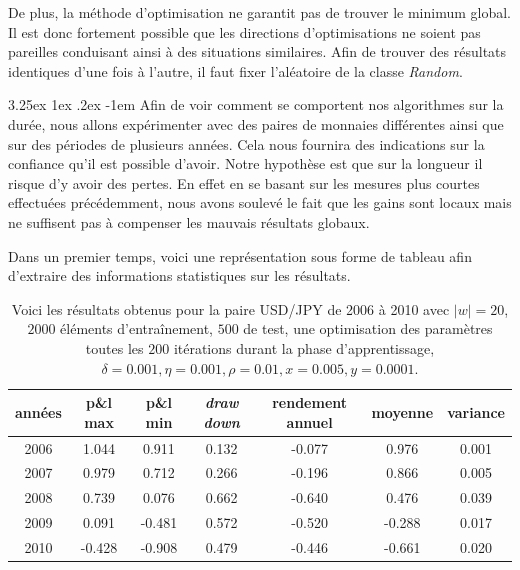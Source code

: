 \documentclass[a4paper, 11pt]{article}
\makeatletter
\renewcommand\paragraph{\@startsection{paragraph}{5}{\z@}%
  {3.25ex \@plus1ex \@minus.2ex}%
  {-1em}%
  {\normalfont\normalsize\bfseries}}
\makeatother
\begin{document}
De plus, la méthode d'optimisation ne garantit pas de trouver le minimum global. Il est donc fortement possible que les directions d'optimisations ne soient pas pareilles conduisant ainsi à des situations similaires. Afin de trouver des résultats identiques d'une fois à l'autre, il faut fixer l'aléatoire de la classe \textit{Random}.
 

\paragraph{}
Afin de voir comment se comportent nos algorithmes sur la durée, nous allons expérimenter avec des paires de monnaies différentes ainsi que sur des périodes de plusieurs années. Cela nous fournira des indications sur la confiance qu'il est possible d'avoir. Notre hypothèse est que sur la longueur il risque d'y avoir des pertes. En effet en se basant sur les mesures plus courtes effectuées précédemment, nous avons soulevé le fait que les gains sont locaux mais ne suffisent pas à compenser les mauvais résultats globaux.

Dans un premier temps, voici une représentation sous forme de tableau afin d'extraire des informations statistiques sur les résultats.

\begin{table}[h!]
	\centering
	\begin{tabular}{|c|c|c|c|c|c|c|}
		\hline
			années & p\&l max & p\&l min & \textit{draw down} & rendement annuel & moyenne & variance\\
			\hline
			2006 & 1.044 & 0.911 & 0.132 & -0.077 & 0.976 & 0.001 \\
			\hline
			2007 & 0.979 & 0.712 & 0.266 & -0.196 & 0.866 & 0.005 \\
			\hline
			2008 & 0.739 & 0.076 & 0.662 & -0.640 & 0.476 & 0.039 \\
			\hline
			2009 & 0.091 & -0.481 & 0.572 & -0.520 & -0.288 & 0.017 \\
			\hline
			2010 & -0.428 & -0.908 & 0.479 & -0.446 & -0.661 & 0.020 \\	
			\hline
	\end{tabular}
\caption{Voici les résultats obtenus pour la paire USD/JPY de 2006 à 2010 avec $|w| = 20$, $2000$ éléments d'entraînement, $500$ de test, une optimisation des
	paramètres toutes les $200$ itérations durant la phase d'apprentissage, $\delta = 0.001, \eta=0.001,\rho=0.01, x = 0.005, y=0.0001$.}
\end{table}
\end{document}

